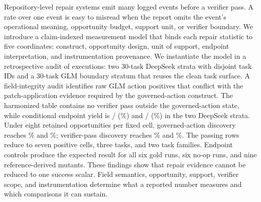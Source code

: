 Repository-level repair systems emit many logged events before a verifier pass. A rate over one event is easy to misread when the report omits the event's operational meaning, opportunity budget, support unit, or verifier boundary. We introduce a claim-indexed measurement model that binds each repair statistic to five coordinates: construct, opportunity design, unit of support, endpoint interpretation, and instrumentation provenance. We instantiate the model in a retrospective audit of \TotalRows{} executions: two 30-task DeepSeek strata with disjoint task IDs and a 30-task GLM boundary stratum that reuses the clean task surface. A field-integrity audit identifies \ContradictionRows{} raw GLM action positives that conflict with the patch-application evidence required by the governed-action construct. The harmonized table contains no verifier pass outside the governed-action state, while conditional endpoint yield is \CleanPasses{}/\CleanActions{} (\CleanYield\%) and \ExtensionPasses{}/\ExtensionActions{} (\ExtensionYield\%) in the two DeepSeek strata. Under eight retained opportunities per fixed cell, governed-action discovery reaches \CleanActionDiscoveryKEight\% and \ExtensionActionDiscoveryKEight\%; verifier-pass discovery reaches \CleanPassDiscoveryKEight\% and \ExtensionPassDiscoveryKEight\%. The \DeepSeekPasses{} passing rows reduce to seven positive cells, three tasks, and two task families. Endpoint controls produce the expected result for all six gold runs, six no-op runs, and nine reference-derived mutants. These findings show that repair evidence cannot be reduced to one success scalar. Field semantics, opportunity, support, verifier scope, and instrumentation determine what a reported number measures and which comparisons it can sustain.
